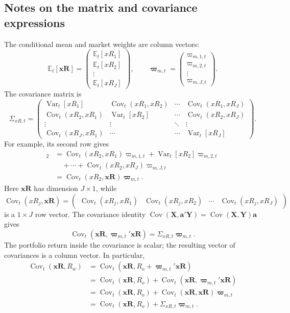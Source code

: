\documentclass[11pt]{article}
\newcommand{\Et}{\mathbb{E}_t}
\newcommand{\Vt}{\operatorname{Var}_t}
\newcommand{\Ct}{\operatorname{Cov}_t}
\begin{document}
\subsection*{Notes on the matrix and covariance expressions}
The conditional mean and market weights are column vectors:
\[
\Et[\mathbf{xR}]=\begin{pmatrix}\Et[xR_1]\\\Et[xR_2]\\\vdots\\\Et[xR_J]\end{pmatrix},
\qquad
\boldsymbol\varpi_{m,t}=\begin{pmatrix}\varpi_{m,1,t}\\\varpi_{m,2,t}\\\vdots\\\varpi_{m,J,t}\end{pmatrix}.
\]
The covariance matrix is
\[
\Sigma_{xR,t}=\begin{pmatrix}
\Vt[xR_1]&\Ct(xR_1,xR_2)&\cdots&\Ct(xR_1,xR_J)\\
\Ct(xR_2,xR_1)&\Vt[xR_2]&\cdots&\Ct(xR_2,xR_J)\\
\vdots&\vdots&\ddots&\vdots\\
\Ct(xR_J,xR_1)&\cdots&\cdots&\Vt[xR_J]
\end{pmatrix}.
\]
\clearpage
For example, its second row gives
\begin{align*}
[\Sigma_{xR,t}\boldsymbol\varpi_{m,t}]_2
&=\Ct(xR_2,xR_1)\varpi_{m,1,t}
+\Vt[xR_2]\varpi_{m,2,t}\\
&\quad+\cdots+\Ct(xR_2,xR_J)\varpi_{m,J,t}\\
&=\Ct(xR_2,\mathbf{xR})\boldsymbol\varpi_{m,t}.
\end{align*}
Here $\mathbf{xR}$ has dimension $J\times1$, while
\[
\Ct(xR_j,\mathbf{xR})=
\begin{pmatrix}\Ct(xR_j,xR_1)&\Ct(xR_j,xR_2)&\cdots&\Ct(xR_j,xR_J)\end{pmatrix}
\]
is a $1\times J$ row vector.
The covariance identity $\operatorname{Cov}(\mathbf X,\mathbf a'\mathbf Y)
=\operatorname{Cov}(\mathbf X,\mathbf Y)\mathbf a$ gives
\[
\Ct(\mathbf{xR},\boldsymbol\varpi_{m,t}'\mathbf{xR})
=\Sigma_{xR,t}\boldsymbol\varpi_{m,t}.
\]
The portfolio return inside the covariance is scalar; the resulting vector
of covariances is a column vector. In particular,
\begin{align*}
\Ct(\mathbf{xR},R_w)
&=\Ct(\mathbf{xR},R_o+\boldsymbol\varpi_{m,t}'\mathbf{xR})\\
&=\Ct(\mathbf{xR},R_o)
+\Ct(\mathbf{xR},\boldsymbol\varpi_{m,t}'\mathbf{xR})\\
&=\Ct(\mathbf{xR},R_o)
+\Ct(\mathbf{xR},\mathbf{xR})\boldsymbol\varpi_{m,t}\\
&=\Ct(\mathbf{xR},R_o)+\Sigma_{xR,t}\boldsymbol\varpi_{m,t}.
\end{align*}
\end{document}
